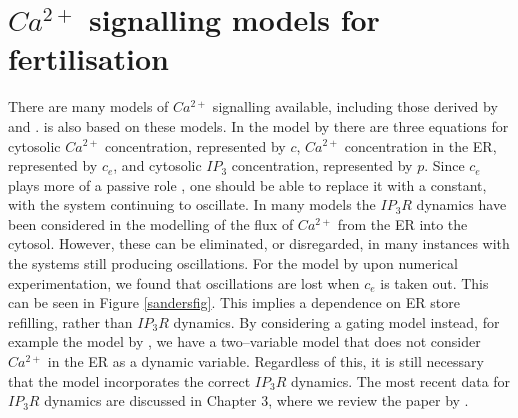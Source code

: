  
\chapter{$Ca^{2+}$ signalling models for fertilisation}
There are many models of $Ca^{2+}$ signalling available, including {those} derived by  and .  is also based on these models. In the model by  there are three equations for cytosolic $Ca^{2+}$ concentration, represented by $c$, $Ca^{2+}$ concentration in the ER, represented by $c_e$, and cytosolic $IP_3$ concentration, represented by $p$. Since $c_e$ plays more of a passive role , one should be able to replace it with a constant, with the system continuing to oscillate. In many models the $IP_3R$ dynamics have been considered in the modelling of the flux of $Ca^{2+}$ from the ER into the cytosol. However, these can be eliminated, or disregarded, in many instances with the systems still producing oscillations. For the model by  upon numerical experimentation, we found that oscillations are lost when $c_e$ is taken out.  {This can be seen in Figure \ref{sandersfig}.} This implies a dependence on ER store refilling, rather than $IP_3R$ dynamics. By considering a gating model instead, for example the model by , we have a two--variable model that does not consider $Ca^{2+}$ in the ER as a dynamic variable. Regardless of this, it is still necessary that the model incorporates the correct $IP_3R$ dynamics. The most recent data for $IP_3R$ dynamics are discussed in Chapter 3, where we review the paper by . 
